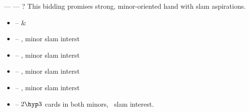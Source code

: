 \noindent
\begin{flushleft}
   ---  --- ? \linebreak
  This bidding promises strong, minor-oriented hand with slam aspirations.
\end{flushleft}
\begin{itemize}
  \item {} --  \& 
  \item {} -- , minor slam interst
  \item {} -- , minor slam interst
  \item {} -- , minor slam interst
  \item {} -- , minor slam interst
  \item {} -- $2\hyp 3$ cards in both minors, \no\ slam interest.
\end{itemize}
